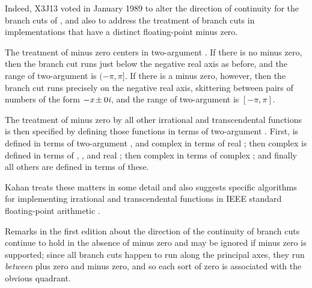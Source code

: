 \begin{new}
Indeed, X3J13 voted in January 1989
to alter the direction of continuity for
the branch cuts of , and also
to address the treatment of branch cuts
in implementations that have a distinct floating-point minus zero.

The treatment of minus zero centers in two-argument .
If there is no minus zero, then the branch cut runs just below the negative real
axis as before, and the range of two-argument  is $(-\pi,\pi]$.
If there is a minus zero, however, then the branch cut runs precisely on the negative real
axis, skittering between pairs of numbers of the form $-\emph{x}\pm 0\emph{i}$,
and the range of two-argument  is $[-\pi,\pi]$.

The treatment of minus zero by all other irrational and transcendental functions
is then specified by defining those functions in terms of two-argument .
First,  is defined in terms of two-argument , and
complex  in terms of real ;
then complex  is defined in terms of , , and real ;
then complex  in terms of complex ;
and finally all others are defined in terms of these.

Kahan \cite{KAHAN-COMPLEX-FNS} treats these matters in some detail and also
suggests specific algorithms for implementing irrational and transcendental functions
in IEEE standard floating-point arithmetic \cite{IEEE-PROPOSED-FLOATING-POINT-STANDARD}.

Remarks in the first edition about the direction of the continuity of branch
cuts continue to hold in the absence of minus zero and may be ignored if minus zero
is supported; since all branch cuts happen to run along the principal axes, they
run \emph{between} plus zero and minus zero, and so each sort of zero is associated
with the obvious quadrant.
\end{new}

